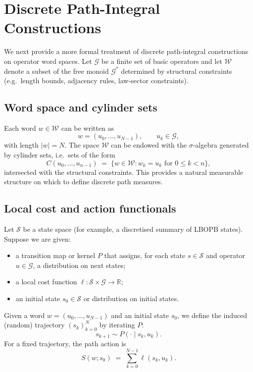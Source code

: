 \documentclass[11pt]{book}
\theoremstyle{plain}
\theoremstyle{definition}
\theoremstyle{remark}
\begin{document}
\section{Discrete Path-Integral Constructions}


We next provide a more formal treatment of discrete path-integral
constructions on operator word spaces. Let $\mathcal{G}$ be a finite
set of basic operators and let $\mathcal{W}$ denote a subset of the
free monoid $\mathcal{G}^{*}$ determined by structural constraints
(e.g.\ length bounds, adjacency rules, law-sector constraints).

\subsection*{Word space and cylinder sets}

Each word $w \in \mathcal{W}$ can be written as
\[
  w = (u_{0},\dots,u_{N-1}),
  \qquad u_{k} \in \mathcal{G},
\]
with length $|w| = N$. The space $\mathcal{W}$ can be endowed with
the $\sigma$-algebra generated by cylinder sets, i.e.\ sets of the
form
\[
  C(u_{0},\dots,u_{n-1})
  \;=\;
  \{ w \in \mathcal{W} : w_{k} = u_{k}
    \text{ for } 0 \le k < n \},
\]
intersected with the structural constraints. This provides a natural
measurable structure on which to define discrete path measures.

\subsection*{Local cost and action functionals}

Let $\mathcal{S}$ be a state space (for example, a discretised
summary of LBOPB states). Suppose we are given:

\begin{itemize}
  \item a transition map or kernel $P$ that assigns, for each state
        $s \in \mathcal{S}$ and operator $u \in \mathcal{G}$, a
        distribution on next states;
  \item a local cost function
        $\ell \colon \mathcal{S} \times \mathcal{G} \to \mathbb{R}$;
  \item an initial state $s_{0} \in \mathcal{S}$ or distribution on
        initial states.
\end{itemize}

Given a word $w = (u_{0},\dots,u_{N-1})$ and an initial state $s_{0}$,
we define the induced (random) trajectory $(s_{k})_{k=0}^{N}$ by
iterating $P$:
\[
  s_{k+1} \sim P(\cdot \mid s_{k}, u_{k}).
\]
For a fixed trajectory, the path action is
\[
  S(w; s_{0})
  \;=\;
  \sum_{k=0}^{N-1} \ell(s_{k}, u_{k}).
\]
\end{document}
